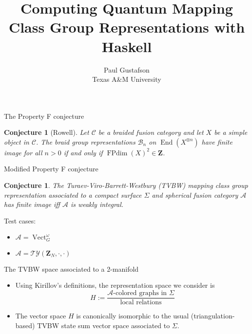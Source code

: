 \documentclass{beamer}
\title{Computing Quantum Mapping Class Group Representations with Haskell}
\date{Paul Gustafson \\ Texas A\&M University}
\DeclareMathOperator{\FPdim}{FPdim}
\DeclareMathOperator{\End}{End}
\DeclareMathOperator{\Vect}{Vect}
\newtheorem{conj}[theorem]{Conjecture}
\begin{document}
\frame{\titlepage}


\begin{frame}{The Property F conjecture}
\begin{conj}[Rowell]
Let $\mathcal C$ be a braided fusion category and let $X$ be a simple object in $\mathcal C$.  The braid group representations $\mathcal B_n$ on $\End(X^{\otimes n})$
have finite image for all $n>0$ if and only if $\FPdim(X)^2 \in \mathbf Z$.
\end{conj}
\end{frame}

\begin{frame}{Modified Property F conjecture}
\begin{conj}
The Turaev-Viro-Barrett-Westbury (TVBW) mapping class group representation associated to a compact surface $\Sigma$ and spherical fusion category $\mathcal A$ has finite image iff $\mathcal A$ is weakly integral.
\end{conj}

Test cases:

\begin{itemize}
\item $\mathcal A = \Vect_G^\omega$
\item $\mathcal A = \mathcal{TY}(\mathbf{Z}_N, \cdot, \cdot)$
\end{itemize}
\end{frame}


\begin{frame}{The TVBW space associated to a 2-manifold}
  \begin{itemize}
    \item 
        Using Kirillov's definitions, the representation space we consider is
        \[
        H := \frac{\text{$\mathcal A$-colored graphs in $\Sigma$}  }
        {\text{local relations}}
       \]
    \pause
    \item The vector space $H$ is canonically isomorphic to the usual (triangulation-based) TVBW state sum vector space associated to $\Sigma$. 
   \end{itemize}
\end{frame}
\end{document}
